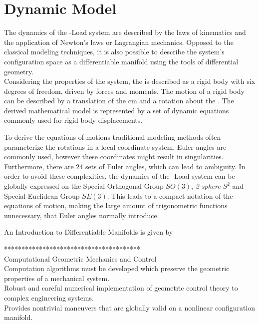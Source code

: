 \chapter{Dynamic Model} \label{ch:model}


The dynamics of the -Load system are described by the laws of kinematics and the application of Newton's laws or Lagrangian mechanics. Opposed to the classical modeling techniques, it is also possible to describe the system's configuration space as a differentiable manifold using the tools of differential geometry. \\

Considering the properties of the system, the  is described as a rigid body with six degrees of freedom, driven by forces and moments. The motion of a rigid body can be described by a translation of the \acf{cm} and a rotation about the . The derived mathematical model is represented by a set of dynamic equations commonly used for rigid body displacements. 

To derive the equations of motions traditional modeling methods often parameterize the rotations in a local coordinate system. Euler angles are commonly used, however these coordinates might result in singularities. Furthermore, there are 24 sets of Euler angles, which can lead to ambiguity. In order to avoid these complexities, the dynamics of the -Load system can be globally expressed on the Special Orthogonal Group $SO(3)$, \textit{2-sphere} $ S^2 $ and Special Euclidean Group $ SE(3) $. This leads to a compact notation of the equations of motion, making the large amount of trigonometric functions unnecessary, that Euler angles normally introduce.

An Introduction to Differentiable Manifolds is given by \cite{Boothby2003}

\cite{Bullo2005}
\cite{Jurdjevic1997}


***************************************\\
Computational Geometric Mechanics and Control\\
Computation algorithms must be developed which preserve the geometric properties of a mechanical system.\\
Robust and careful numerical implementation of geometric control theory to complex engineering systems.\\
Provides nontrivial maneuvers that are globally valid on a nonlinear configuration manifold.

